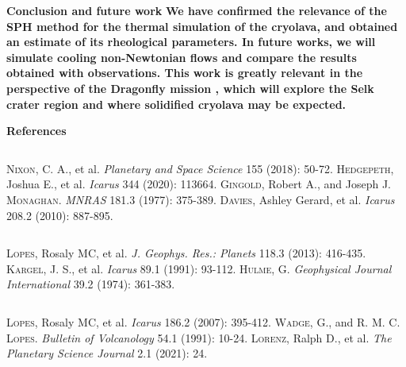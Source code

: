 \documentclass[final,t]{beamer}
\begin{document}
\begin{frame}
\begin{block}{\textbf{Conclusion and future work}}\rightskip=0pt\leftskip=0pt
	\textbf{We have confirmed the relevance of the SPH method for the thermal simulation of the cryolava, and obtained an estimate of its rheological parameters. In future works, we will simulate cooling non-Newtonian flows and compare the results obtained with observations. This work is greatly relevant in the perspective of the Dragonfly mission \cite{Dragonfly}, which will explore the Selk crater region and where solidified cryolava may be expected.}
\end{block}

    \vspace{1cm}

\begin{block}{\textbf{References}}\rightskip=0pt\leftskip=0pt
	\begin{columns}
	\begin{thebibliography}{9}
		\begin{column}{0.3\textwidth}\vspace{-1.5cm}
		{\textsc{Nixon}, C. A., et al. \emph{Planetary and Space Science} 155 (2018): 50-72.}
		{\textsc{Hedgepeth}, Joshua E., et al. \emph{Icarus} 344 (2020): 113664.}
		{\textsc{Gingold}, Robert A., and Joseph J. \textsc{Monaghan}. \emph{MNRAS} 181.3 (1977): 375-389.}
		{\textsc{Davies}, Ashley Gerard, et al. \emph{Icarus} 208.2 (2010): 887-895.}
		\end{column}
		\begin{column}{0.31\textwidth}\vspace{-1.5cm}
		{\textsc{Lopes}, Rosaly MC, et al. \emph{J. Geophys. Res.: Planets} 118.3 (2013): 416-435.}
		{\textsc{Kargel}, J. S., et al. \emph{Icarus} 89.1 (1991): 93-112.}
		{\textsc{Hulme}, G. \emph{Geophysical Journal International} 39.2 (1974): 361-383.}
		\end{column}
		\begin{column}{0.32\textwidth}\vspace{-1.5cm}
		{\textsc{Lopes}, Rosaly MC, et al. \emph{Icarus} 186.2 (2007): 395-412.}
		{\textsc{Wadge}, G., and R. M. C. \textsc{Lopes}. \emph{Bulletin of Volcanology} 54.1 (1991): 10-24.}
		{\textsc{Lorenz}, Ralph D., et al. \emph{The Planetary Science Journal} 2.1 (2021): 24.}
		\end{column}
	\end{thebibliography}
	\end{columns}
\end{block}
    
\end{frame}
\end{document}
